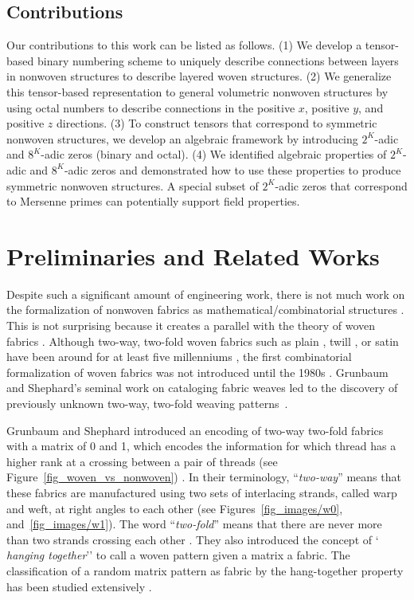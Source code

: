 \documentclass[times,twocolumn,final]{elsarticle}
\begin{document}
\subsection{Contributions}
\label{Sec_Contributions}

Our contributions to this work can be listed as follows. 
(1) We develop a tensor-based binary numbering scheme to uniquely describe connections between layers in nonwoven structures to describe layered woven structures. 
(2) We generalize this tensor-based representation to general volumetric nonwoven structures by using octal numbers to describe connections in the positive $x$, positive $y$, and positive $z$ directions. 
(3) To construct tensors that correspond to symmetric nonwoven structures, we develop an algebraic framework by introducing $2^K$-adic and $8^{K}$-adic zeros (binary and octal). 
(4) We identified algebraic properties of $2^K$-adic and $8^{K}$-adic zeros and demonstrated how to use these properties to produce symmetric nonwoven structures. A special subset of $2^K$-adic zeros that correspond to Mersenne primes can potentially support field properties. 


\section{Preliminaries and Related Works}
\label{Sec_Previous_Work}

Despite such a significant amount of engineering work, there is not much work on the formalization of nonwoven fabrics as mathematical/combinatorial structures \cite{zarrinmehr2023satin}. This is not surprising because it creates a parallel with the theory of woven fabrics \cite{akleman2015extended,akleman2020topologically}. Although two-way, two-fold woven fabrics such as plain \cite{akleman2009cyclic}, twill \cite{akleman2011cyclic}, or satin have been around for at least five millenniums \cite{horrocks2000}, the first combinatorial formalization of woven fabrics was not introduced until the 1980s \cite{grunbaum1980satins}. Grunbaum and Shephard's seminal work on cataloging fabric weaves led to the discovery of previously unknown two-way, two-fold weaving patterns~\cite{grunbaum1980satins, grunbaum1985catalogue, grunbaum1986extension, grunbaum1988isonemal, roth1993symmetry}. 

Grunbaum and Shephard introduced an encoding of two-way two-fold fabrics with a matrix of 0 and 1, which encodes the information for which thread has a higher rank at a crossing between a pair of threads (see Figure~\ref{fig_woven_vs_nonwoven}) \cite{grunbaum1980satins}.
In their terminology, ``\textit{two-way}'' means that these fabrics are manufactured using two sets of interlacing strands, called warp and weft, at right angles to each other (see Figures~\ref{fig_images/w0}, and~\ref{fig_images/w1}). The word ``\textit{two-fold}'' means that there are never more than two strands crossing each other \cite{grunbaum1980satins, akleman2009cyclic}. They also
introduced the concept of `\textit{ hanging together}'' to call a woven pattern given a matrix a fabric. The classification of a random matrix pattern as fabric by the hang-together property has been studied extensively \cite{griswold2004when, griswold2004from, clapham1980when, enns84efficient, delaney1984when}.
\end{document}
